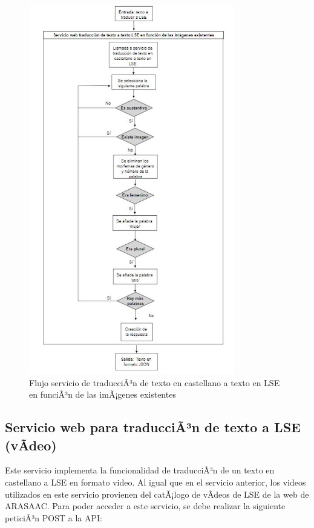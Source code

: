 \begin{figure}[]
	\centering
	\includegraphics[width=0.8\textwidth]{Imagenes/Fuentes/Text2LSE/FlujoTextoImagenTexto.jpg}
	\caption{ Flujo servicio de traducciÃ³n de texto en castellano a texto en LSE en funciÃ³n de las imÃ¡genes existentes }
	\label {fig: imgFlujoTextoImagenTextoText2LSE}
\end{figure}


\subsection{Servicio web para traducciÃ³n de texto a LSE (vÃ­deo)}

Este servicio implementa la funcionalidad de traducciÃ³n de un texto en castellano a LSE en formato video. Al igual que en el servicio anterior, los videos utilizados en este servicio provienen del catÃ¡logo de vÃ­deos de LSE de la web de ARASAAC. Para poder acceder a este servicio, se debe realizar la siguiente peticiÃ³n POST a la API:\\

